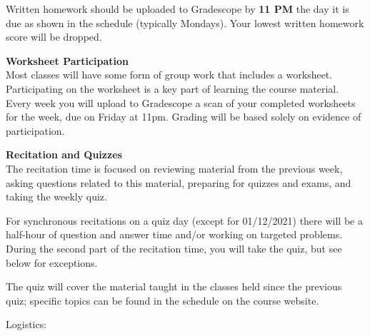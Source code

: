 \documentclass[12pt]{article}
\renewcommand{\emph}[1]{\textsf{\textbf{#1}}}
\newcommand{\localhead}[1]{\par\smallskip\textbf{#1}\nobreak\\}%
\def\heading#1{\localhead{\large\emph{#1}}}
\begin{document}
Written homework should be uploaded to Gradescope by {\bf 11 PM} the day
it is due as shown in the schedule (typically Mondays).  Your lowest written homework score will be dropped.

\heading{Worksheet Participation}

Most classes will have some form of group work that includes
a worksheet.  Participating on the worksheet is a key part
of learning the course material.  Every week you will upload to 
Gradescope a scan of your completed worksheets for the week,
due on Friday at 11pm.  Grading will be based solely on 
evidence of participation.

\heading{Recitation and Quizzes}
The recitation time is focused on reviewing material from the previous week, asking questions related to this material, preparing for quizzes and exams, and taking the weekly quiz.

For synchronous recitations on a quiz day (except for 01/12/2021) there will be a half-hour of question and answer time and/or working on targeted problems. During the second part of the recitation time, you will take the quiz, but see below for exceptions.

The quiz will cover the material taught in the classes held since the previous quiz; specific topics can be found in the schedule on the course website.  

Logistics:
\end{document}
